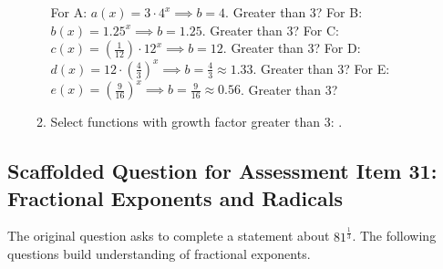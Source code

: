 \documentclass[12pt]{article}
\begin{document}
\begin{enumerate}[label=30.\arabic*]
\begin{enumerate}[label=\alph*)]
        For A: \(a(x) = 3 \cdot 4^x \implies b=4\). Greater than 3? \underline{\hspace{0.5cm}}
        For B: \(b(x) = 1.25^x \implies b=1.25\). Greater than 3? \underline{\hspace{0.5cm}}
        For C: \(c(x) = (\frac{1}{12}) \cdot 12^x \implies b=12\). Greater than 3? \underline{\hspace{0.5cm}}
        For D: \(d(x) = 12 \cdot (\frac{4}{3})^x \implies b=\frac{4}{3} \approx 1.33\). Greater than 3? \underline{\hspace{0.5cm}}
        For E: \(e(x) = (\frac{9}{16})^x \implies b=\frac{9}{16} \approx 0.56\). Greater than 3? \underline{\hspace{0.5cm}}
        \item Select functions with growth factor greater than 3: \underline{\hspace{2cm}}.
    \end{enumerate}
\end{enumerate}

\subsection*{Scaffolded Question for Assessment Item 31: Fractional Exponents and Radicals}
The original question asks to complete a statement about \( 81^{\frac{1}{3}} \). The following questions build understanding of fractional exponents.
\end{document}

